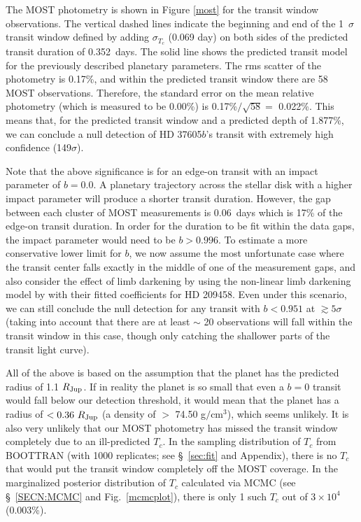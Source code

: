 The MOST photometry is shown in Figure \ref{most} for the transit
window observations. The vertical dashed lines indicate the beginning
and end of the 1~$\sigma$ transit window defined by adding
$\sigma_{T_c}$ (0.069 day) on both sides of the predicted transit
duration of 0.352~days. The solid line shows the predicted transit
model for the previously described planetary parameters.
The rms scatter of the photometry is 0.17\%, and within the predicted
transit window there are 58 MOST observations. Therefore, the standard
error on the mean relative photometry (which is measured to be 0.00\%)
is 0.17\%$/\sqrt{58} = $ 0.022\%. This means that, for the predicted
transit window and a predicted depth of 1.877\%, we can conclude a
null detection of HD 37605$b$'s transit with extremely high confidence
(149$\sigma$).

Note that the above significance is for an edge-on transit with an
impact parameter of $b = 0.0$. A planetary trajectory across the
stellar disk with a higher impact parameter will produce a shorter
transit duration. However, the gap between each cluster of MOST
measurements is 0.06~days which is 17\% of the edge-on transit
duration. In order for the duration to be fit within the data gaps,
the impact parameter would need to be $b > 0.996$. To estimate a more
conservative lower limit for $b$, we now assume the most unfortunate
case where the transit center falls exactly in the middle of one of
the measurement gaps, and also consider the effect of limb darkening
by using the non-linear limb darkening model by
\cite{2002ApJ...580L.171M} with their fitted coefficients for HD
209458. Even under this scenario, we can still conclude the null
detection for any transit with $b<0.951$ at $\gtrsim 5\sigma$ (taking
into account that there are at least $\sim$ 20 observations will fall
within the transit window in this case, though only catching the
shallower parts of the transit light curve).

All of the above is based on the assumption that the planet has the
predicted radius of 1.1 $R_{\rm Jup}$. If in reality the planet is so
small that even a $b=0$ transit would fall below our detection
threshold, it would mean that the planet has a radius of $< 0.36\ R_{\rm
  Jup}$ (a density of $>$ 74.50 g$/$cm$^3$), which seems unlikely.
It is also very unlikely that our MOST photometry has missed the
transit window completely due to an ill-predicted $T_c$. In the
sampling distribution of $T_c$ from BOOTTRAN (with 1000 replicates;
see \S~\ref{sec:fit} and Appendix), there is no $T_c$ that would put
the transit window completely off the MOST coverage. In the
marginalized posterior distribution of $T_c$ calculated via MCMC (see
\S~\ref{SECN:MCMC} and Fig.~\ref{mcmcplot}), there is only 1 such
$T_c$ out of $3 \times 10^4$ (0.003\%).




